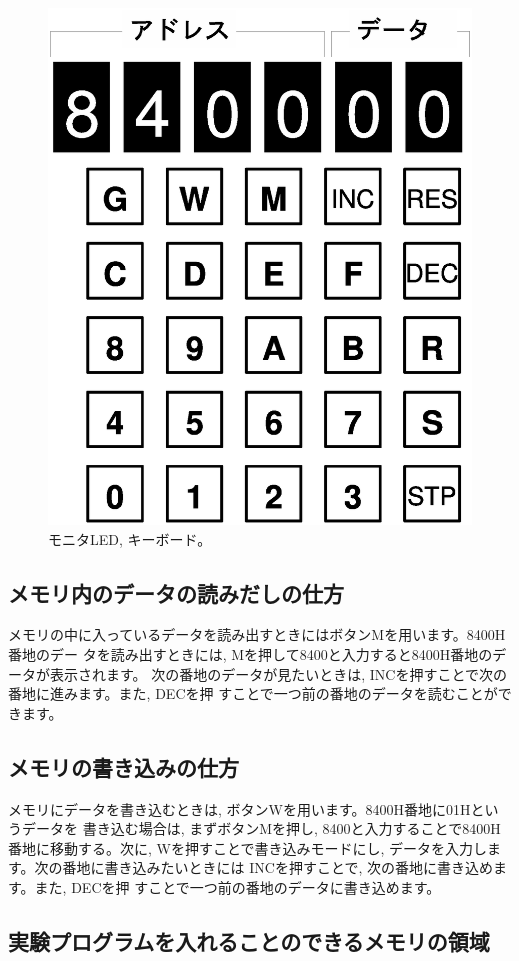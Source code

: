 \begin{figure}[htbp]
\begin{center}
\includegraphics[width=0.5\linewidth]{img/monitor-key.eps}
\caption{モニタLED, キーボード。}
\label{fig:monitor-key}
\end{center}
\end{figure}

\subsection{メモリ内のデータの読みだしの仕方}

メモリの中に入っているデータを読み出すときにはボタンMを用います。8400H番地のデー
タを読み出すときには, Mを押して8400と入力すると8400H番地のデータが表示されます。
次の番地のデータが見たいときは, INCを押すことで次の番地に進みます。また, DECを押
すことで一つ前の番地のデータを読むことができます。

\subsection{メモリの書き込みの仕方}

メモリにデータを書き込むときは, ボタンWを用います。8400H番地に01Hというデータを
書き込む場合は, まずボタンMを押し, 8400と入力することで8400H番地に移動する。次に,
Wを押すことで書き込みモードにし,  データを入力します。次の番地に書き込みたいときには
INCを押すことで, 次の番地に書き込めます。また, DECを押
すことで一つ前の番地のデータに書き込めます。

\subsection{実験プログラムを入れることのできるメモリの領域}

